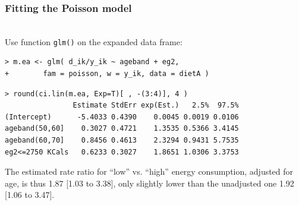 \documentclass[handout,12pt]{beamer}
\begin{document}

\begin{frame}[fragile]

\frametitle{Fitting the Poisson model}
\ \\
Use function {\tt glm()} on the expanded data frame:
\begin{verbatim}
> m.ea <- glm( d_ik/y_ik ~ ageband + eg2, 
+        fam = poisson, w = y_ik, data = dietA )
\end{verbatim}
\small
\begin{verbatim}
> round(ci.lin(m.ea, Exp=T)[ , -(3:4)], 4 )
                Estimate StdErr exp(Est.)   2.5%  97.5%
(Intercept)      -5.4033 0.4390    0.0045 0.0019 0.0106
ageband(50,60]    0.3027 0.4721    1.3535 0.5366 3.4145
ageband(60,70]    0.8456 0.4613    2.3294 0.9431 5.7535
eg2<=2750 KCals   0.6233 0.3027    1.8651 1.0306 3.3753
\end{verbatim}
\normalsize
The estimated rate ratio for ``low'' vs. ``high''
energy consumption, adjusted for age, is thus
1.87 [1.03 to 3.38], only slightly lower than the 
unadjusted one 1.92 [1.06 to 3.47].

\end{frame}
\end{document}
